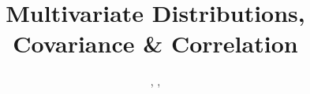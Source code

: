 \documentclass[11.5pt]{article}
\title{Multivariate Distributions, Covariance \& Correlation}
\author{\shira, \tim, \creds}
\begin{document}
\maketitle

\begin{notes}

\begin{comment}
\section*{Introduction}
Sometimes we have more than one random variable of interest, and we want to study probabilities associated with all of the random variables. Instead of studying the distributions of $X_1, X_2, X_3$ separately, we can study the distribution of the multivariate vector $\textbf{X} = (X_1, X_2, X_3)$. Joint PDFs and CDFs are analogous to multivariate versions of univariate PDFs and CDFs. Usually joint PDFs and PMFs carry more information than the marginal ones do, because they account for the interactions between the various random variables. If, however, the random variables are independent, then the joint PMF/PDF is just the product of the marginals and we get no extra information by studying them jointly rather than marginally.

\section*{Joint Distributions}
Joint Probability of events $A$ and $B$: $P(A,B) = P(A \cap B)$

\begin{table}[h]\begin{center}
	\begin{tabular}{ccccc} \toprule
		\textbf{Joint CDF} & ~ & \textbf{Joint PMF} & ~ & \textbf{Joint PDF} \\  \midrule
		$F_{X, Y}(x, y) = P(X \leq x,Y \leq y)$ & ~ & $P(X=x, Y=y)$ & ~ & $f_{X,Y}(x,y) = \frac{\delta}{\delta x} \frac{\delta}{\delta y}F_{X, Y}(x, y)$ \\ \bottomrule
	\end{tabular}\end{center}
\end{table}

Both the Joint PMF and Joint PDF must be non-negative and sum/integrate to 1. ($\sum_x \sum_y P(X=x, Y=y) = 1$) ($\int_x\int_y f_{X,Y}(x,y) = 1$). Like in the univariate cause, you sum/integrate the PMF/PDF to get the CDF.

\section*{Conditional Distributions}
By Bayes' Rule, $P(A|B) = \frac{P(B|A)P(A)}{P(B)}$ Similar conditions apply to conditional distributions of random variables.\\


\end{comment}
\end{notes}
\end{document}
